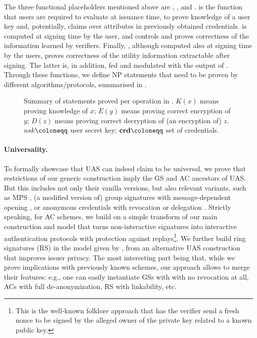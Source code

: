 The three functional placeholders mentioned above are \fissue, \feval, and
\finsp. \fissue is the function that users are required to evaluate at issuance
time, to prove knowledge of a user key and, potentially, claims over attributes
in previously obtained credentials. \feval is computed at signing time by the
user, and controls and proves correctness of the information learned by
verifiers. Finally, \finsp, although  computed also at signing time by the
users, proves correctness of the utility information extractable after signing.
The latter is, in addition, fed and modulated with the output of \feval. Through
these functions, we define NP statements that need to be proven by different
algorithms/protocols, summarised in .

\begin{figure}[ht!]
  \centering
  \scalebox{0.85}{
    
  }
  \caption{Summary of statements proved per operation in \UAS.
    $K(x)$ means proving knowledge of $x$; $E(y)$ means proving correct
    encryption of $y$; $D(z)$ means proving correct decryption of (an encryption
    of) $z$. $\usk \coloneqq$ user secret key; $\scred \coloneqq$ set of
    credentials.}
  \label{fig:proof-blocks-uas}
\end{figure}

\paragraph{Universality.}
To formally showcase that UAS can indeed claim to be universal, we prove that
restrictions of our generic construction imply the GS and AC ancestors of UAS.
But this includes not only their vanilla versions, but also relevant variants,
such as MPS \cite{ngsy22}, (a modified version of) group signatures with
message-dependent opening \cite{seh+12}, or anonymous credentials with
revocation \cite{cks10} or delegation \cite{bcc+09}.
%
Strictly speaking, for AC schemes, we build on a simple transform of our main
construction and model that turns non-interactive signatures into interactive
authentication protocols with protection against replays\footnote{This is
  the well-known folklore approach that has the verifier send a fresh nonce to
  be signed by the alleged owner of the private key related to a known
  public key.}. We further build ring signatures (RS) in the model given by
\cite{bkm06}, from an alternative UAS construction that improves issuer privacy.
%
The most interesting part being that, while we prove implications with
previously known schemes, our approach allows to merge their features: e.g.,
one can easily instantiate GSs with with no revocation at all, ACs
with full de-anonymization, RS with linkability, etc.

